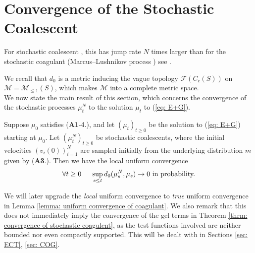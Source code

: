 \section{Convergence of the Stochastic Coalescent}
For stochastic coalescent \cite{A99}, this has jump rate $N$ times larger than for the stochastic coagulant (Marcus--Lushnikov process \cite{L78}) see \cite{N00}.

We recall that $d_0$ is a metric inducing the vague topology $\mathcal{F}(C_c(S))$ on $\mathcal{M}=\mathcal{M}_{\le 1}(S)$, which makes $\mathcal{M}$ into a complete metric space.
\medskip \\ We now state the main result of this section, which concerns the convergence of the stochastic processes $\mu^N_t$ to the solution $\mu_t$ to (\ref{eq: E+G}). 
\begin{lemma}\label{lemma: local uniform convergence of stochastic coagulent}
Suppose $\mu_0$ satisfies (\textbf{A1}-{4.}), and let $(\mu_t)_{t\ge 0}$ be the solution to (\ref{eq: E+G}) starting at $\mu_0$. Let $(\mu^N_t)_{t\ge 0}$ be stochastic coalescents, where the initial velocities $(v_i(0))_{i=1}^N$ are sampled initially from the underlying distribution $m$ given by (\textbf{A3}.). Then we have the local uniform convergence
\begin{equation*}
\forall t\ge 0 \hspace{0.5cm} \sup_{s\le t} d_0(\mu^N_s, \mu_s)\rightarrow 0 \text{ in probability.}
\end{equation*}
\end{lemma} \begin{remark}
We will later upgrade the \emph{local} uniform convergence to \emph{true} uniform convergence in Lemma \ref{lemma: uniform convergence of coagulant}. We also remark that this does not immediately imply the convergence of the gel terms in Theorem \ref{thrm: convergence of stochastic coagulent}, as the test functions involved are neither bounded nor even compactly supported. This will be dealt with in Sections \ref{sec: ECT}, \ref{sec: COG}.

\end{remark}
